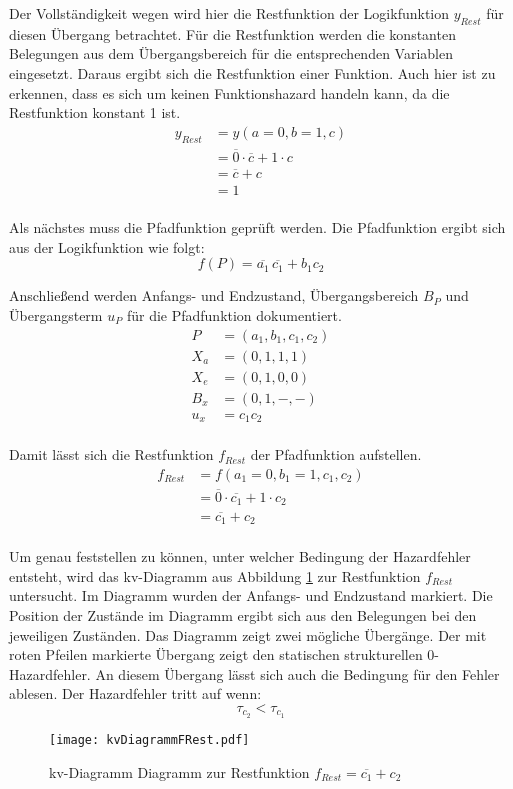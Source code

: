 Der Vollständigkeit wegen wird hier die Restfunktion der Logikfunktion $y_{Rest}$ für diesen Übergang betrachtet. Für die Restfunktion werden die konstanten Belegungen aus dem Übergangsbereich für die entsprechenden Variablen eingesetzt. Daraus ergibt sich die Restfunktion einer Funktion. Auch hier ist zu erkennen, dass es sich um keinen Funktionshazard handeln kann, da die Restfunktion konstant 1 ist.
\begin{align*}
y_{Rest} &= y(a=0,b=1,c) \\ 
         &= \overline{0} \cdot \overline{c} + 1 \cdot c \\ 
         &= \overline{c} + c \\ 
         &= 1 \\
\end{align*}

Als nächstes muss die Pfadfunktion geprüft werden. Die Pfadfunktion ergibt sich aus der Logikfunktion wie folgt:
$$f(P) = \overline{a_1}\hspace{2pt}\overline{c_1}  + b_1c_2$$

Anschließend werden Anfangs- und Endzustand, Übergangsbereich $B_P$ und Übergangsterm $u_P$ für die Pfadfunktion dokumentiert.
\begin{align*}
P   &= (a_1,b_1,c_1, c_2) \\
X_a &= (0,1,1,1) \\
X_e &= (0,1,0,0) \\
B_x &= (0,1,-,-) \\
u_x &= c_1c_2 \\
\end{align*}

Damit lässt sich die Restfunktion $f_{Rest}$ der Pfadfunktion aufstellen.
\begin{align*}
f_{Rest} &= f(a_1=0,b_1=1,c_1,c_2) \\ 
         &= \overline{0} \cdot \overline{c_1}  + 1 \cdot c_2 \\
         &= \overline{c_1} + c_2 \\
\end{align*}

Um genau feststellen zu können, unter welcher Bedingung der Hazardfehler entsteht, wird das {\sc kv}-Diagramm aus Abbildung \ref{kvFRest} zur Restfunktion $f_{Rest}$ untersucht. Im Diagramm wurden der Anfangs- und Endzustand markiert. Die Position der Zustände im Diagramm ergibt sich aus den Belegungen bei den jeweiligen Zuständen. Das Diagramm zeigt zwei mögliche Übergänge. Der mit roten Pfeilen markierte Übergang zeigt den statischen strukturellen 0-Hazardfehler. An diesem Übergang lässt sich auch die Bedingung für den Fehler ablesen. Der Hazardfehler tritt auf wenn:
$$\tau_{c_2} < \tau_{c_1}$$
\begin{figure}[htp]
	\centering
	\texttt{[image: kvDiagrammFRest.pdf]}
	\caption{{\sc kv}-Diagramm Diagramm zur Restfunktion $f_{Rest} = \overline{c_1} + c_2$}
	\label{kvFRest} 
\end{figure} 

